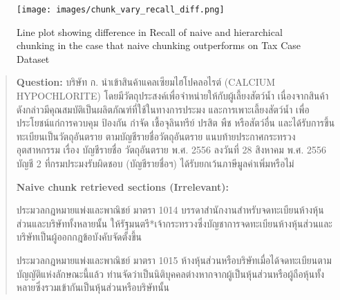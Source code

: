 \begin{figure}[h!]
\centering
\texttt{[image: images/chunk\_vary\_recall\_diff.png]}
\caption{Line plot showing difference in Recall of naive and hierarchical chunking in the case that naive chunking outperforms on Tax Case Dataset}
\end{figure}

\begin{quote}
    \begin{thai}
    \textbf{Question: } บริษัท ก. นำเข้าสินค้าแคลเซียมไฮโปคลอไรต์ (CALCIUM HYPOCHLORITE) โดยมีวัตถุประสงค์เพื่อจำหน่ายให้กับผู้เลี้ยงสัตว์น้ำ เนื่องจากสินค้าดังกล่าวมีคุณสมบัติเป็นผลิตภัณฑ์ที่ใช้ในทางการประมง และการเพาะเลี้ยงสัตว์น้ำ เพื่อประโยชน์แก่การควบคุม ป้องกัน กำจัด เชื้อจุลินทรีย์ ปรสิต พืช หรือสัตว์อื่น และได้รับการขึ้นทะเบียนเป็นวัตถุอันตราย ตามบัญชีรายชื่อวัตถุอันตราย แนบท้ายประกาศกระทรวงอุตสาหกรรม เรื่อง บัญชีรายชื่อ วัตถุอันตราย พ.ศ. 2556 ลงวันที่ 28 สิงหาคม พ.ศ. 2556 บัญชี 2 ที่กรมประมงรับผิดชอบ (บัญชีรายชื่อฯ) ได้รับยกเว้นภาษีมูลค่าเพิ่มหรือไม่
    
    \textbf{Naive chunk retrieved sections (Irrelevant): }
    
    ประมวลกฎหมายแพ่งและพาณิชย์ มาตรา 1014
    บรรดาสำนักงานสำหรับจดทะเบียนห้างหุ้นส่วนและบริษัททั้งหลายนั้น ให้รัฐมนตรี*เจ้ากระทรวงซึ่งบัญชาการจดทะเบียนห้างหุ้นส่วนและบริษัทเป็นผู้ออกกฎข้อบังคับจัดตั้งขึ้น 

    
    ประมวลกฎหมายแพ่งและพาณิชย์ มาตรา 1015
    ห้างหุ้นส่วนหรือบริษัทเมื่อได้จดทะเบียนตามบัญญัติแห่งลักษณะนี้แล้ว ท่านจัดว่าเป็นนิติบุคคลต่างหากจากผู้เป็นหุ้นส่วนหรือผู้ถือหุ้นทั้งหลายซึ่งรวมเข้ากันเป็นหุ้นส่วนหรือบริษัทนั้น 
    
    \end{thai}
\end{quote}

